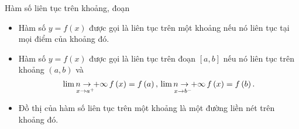 \begin{dang}{Hàm số liên tục trên khoảng, đoạn}
	\begin{itemize}
		\item Hàm số $y=f(x)$ được gọi là liên tục trên một khoảng nếu nó liên tục tại mọi điểm của khoảng đó.\\
		\item Hàm số $y=f(x)$ được gọi là liên tục trên đoạn $[a,b]$ nếu nó liên tục trên khoảng $(a,b)$ và $$\mathop {\lim \limits{n \to +\infty}}\limits_{x \to {a^ + }} f\left( x \right) = f\left( a \right),{\rm{   }}\mathop {\lim \limits{n \to +\infty}}\limits_{x \to {b^ - }} f\left( x \right) = f\left( b \right).$$
		\item Đồ thị của hàm số liên tục trên một khoảng là một đường liền nét trên khoảng đó.
	\end{itemize}
\end{dang}
